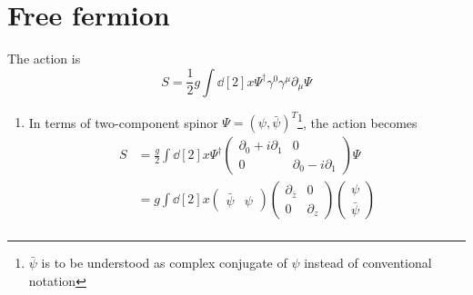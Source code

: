 \section{Free fermion}
The action is 
\begin{equation}
	S = \frac{1}{2}g \int \dd[2]{x} \Psi^\dagger \gamma^0 \gamma^\mu \partial_\mu \Psi
\end{equation}
\begin{enumerate}[label=(\alph*)]
	\item In terms of two-component spinor $\Psi = (\psi,\bar{\psi})^T $\footnote{$\bar{\psi}$ is to be understood as complex conjugate of $\psi$ instead of conventional notation}, the action becomes
		\begin{align*}
			  S &= \frac{g}{2} \int \dd[2]{x} \Psi^\dagger\begin{pmatrix} \partial_0 + i\partial_1 & 0 \\ 0 & \partial_0 - i \partial_1 \end{pmatrix} \Psi \\
				 &= g \int \dd[2]{x} \begin{pmatrix} \bar{\psi} & \psi \end{pmatrix} \begin{pmatrix} \partial_{\bar{z}} & 0 \\ 0 & \partial_z \end{pmatrix} \begin{pmatrix} \psi \\ \bar{\psi}\end{pmatrix} \\

\end{align*}
\end{enumerate}
